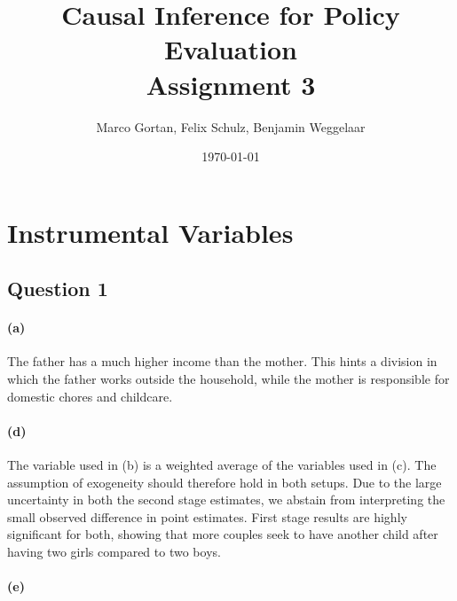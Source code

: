 \documentclass{scrartcl}
\title{Causal Inference for Policy Evaluation\\
\Large{Assignment 3}}
\author{Marco Gortan, Felix Schulz, Benjamin Weggelaar}
\date{\today}
\begin{document}
\maketitle

\section*{Instrumental Variables}

\subsection*{Question 1}

\paragraph*{(a)}

The father has a much higher income than the mother. This hints a division in which the father works outside the household, while the mother is responsible for domestic chores and childcare.



\paragraph*{(d)}



The variable used in (b) is a weighted average of the variables used in (c). The assumption of exogeneity should therefore hold in both setups. Due to the large uncertainty in both the second stage estimates, we abstain from interpreting the small observed difference in point estimates. First stage results are highly significant for both, showing that more couples seek to have another child after having two girls compared to two boys.

\paragraph*{(e)}
\end{document}
